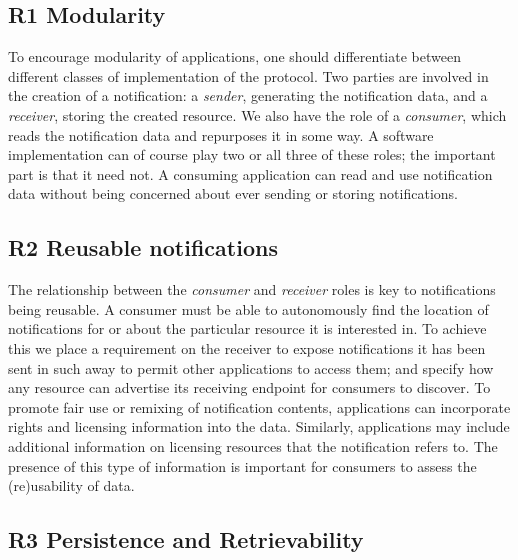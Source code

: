 \documentclass[a4paper]{llncs}
\begin{document}
                                \subsection{R1 Modularity}
  \label{modularity}



\par To encourage modularity of applications, one should differentiate between different classes of implementation of the protocol. Two parties are involved in the creation of a notification: a {\em sender}, generating the notification data, and a {\em receiver}, storing the created resource. We also have the role of a {\em consumer}, which reads the notification data and repurposes it in some way. A software implementation can of course play two or all three of these roles; the important part is that it need not. A consuming application can read and use notification data without being concerned about ever sending or storing notifications.




                                \subsection{R2 Reusable notifications}
  \label{reusable-notifications}



\par The relationship between the {\em consumer} and {\em receiver} roles is key to notifications being reusable. A consumer must be able to autonomously find the location of notifications for or about the particular resource it is interested in. To achieve this we place a requirement on the receiver to expose notifications it has been sent in such away to permit other applications to access them; and specify how any resource can advertise its receiving endpoint for consumers to discover. To promote fair use or remixing of notification contents, applications can incorporate rights and licensing information into the data. Similarly, applications may include additional information on licensing resources that the notification refers to. The presence of this type of information is important for consumers to assess the (re)usability of data.




                                \subsection{R3 Persistence and Retrievability}
  \label{persistence-and-retrievability}
\end{document}
